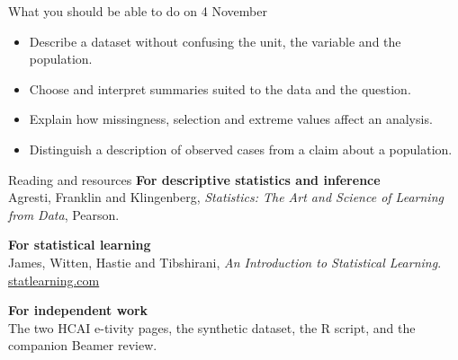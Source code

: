 \begin{frame}{What you should be able to do on 4 November}
\begin{itemize}
\item Describe a dataset without confusing the unit, the variable and the population.
\item Choose and interpret summaries suited to the data and the question.
\item Explain how missingness, selection and extreme values affect an analysis.
\item Distinguish a description of observed cases from a claim about a population.
\end{itemize}
\end{frame}

\begin{frame}{Reading and resources}
\textbf{For descriptive statistics and inference}\\
Agresti, Franklin and Klingenberg, \emph{Statistics: The Art and Science of Learning from Data}, Pearson.
\par\vspace{3mm}
\textbf{For statistical learning}\\
James, Witten, Hastie and Tibshirani, \emph{An Introduction to Statistical Learning}.\\
\href{https://www.statlearning.com/}{statlearning.com}
\par\vspace{3mm}
\textbf{For independent work}\\
The two HCAI e-tivity pages, the synthetic dataset, the R script, and the companion Beamer review.
\end{frame}

